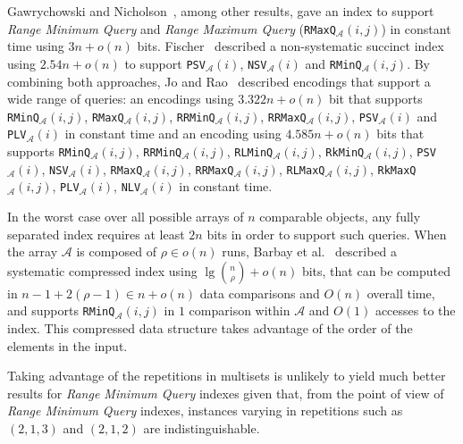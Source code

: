 Gawrychowski and
Nicholson~\cite{2015-ICALP-OptimalEncodingsForRangeTopKSelectionAndMinMax-GawrychowskiNicholson},
among other results, gave an index to support \emph{Range Minimum
  Query} and \emph{Range Maximum Query}
(\texttt{RMaxQ}$_{\mathcal{A}}(i,j)$) in constant time using
$3n + o(n)$ bits.
Fischer~\cite{2011-TCS-CombinedDataStructureForPreviousAndNextSmallerValues-Fischer}
described a non-systematic succinct index using $2.54n + o(n)$ to
support \texttt{PSV}$_{\mathcal{A}}(i)$,
\texttt{NSV}$_{\mathcal{A}}(i)$ and
\texttt{RMinQ}$_{\mathcal{A}}(i,j)$. By combining both approaches, Jo
and
Rao~\cite{2015-COCOON-SimultaneousEncodingsForRangeAndNextPreviousLargerSmallerValueQueries-JoRao}
described encodings that support a wide range of queries: an encodings
using $3.322n + o(n)$ bit that supports
\texttt{RMinQ}$_{\mathcal{A}}(i,j)$,
\texttt{RMaxQ}$_{\mathcal{A}}(i,j)$,
\texttt{RRMinQ}$_{\mathcal{A}}(i,j)$,
\texttt{RRMaxQ}$_{\mathcal{A}}(i,j)$, \texttt{PSV}$_{\mathcal{A}}(i)$
and \texttt{PLV}$_{\mathcal{A}}(i)$ in constant time and an encoding
using $4.585n + o(n)$ bits that supports
\texttt{RMinQ}$_{\mathcal{A}}(i,j)$,
\texttt{RRMinQ}$_{\mathcal{A}}(i,j)$,
\texttt{RLMinQ}$_{\mathcal{A}}(i,j)$,
\texttt{RkMinQ}$_{\mathcal{A}}(i,j)$, \texttt{PSV}$_{\mathcal{A}}(i)$,
\texttt{NSV}$_{\mathcal{A}}(i)$, \texttt{RMaxQ}$_{\mathcal{A}}(i,j)$,
\texttt{RRMaxQ}$_{\mathcal{A}}(i,j)$,
\texttt{RLMaxQ}$_{\mathcal{A}}(i,j)$,
\texttt{RkMaxQ}$_{\mathcal{A}}(i,j)$, \texttt{PLV}$_{\mathcal{A}}(i)$,
\texttt{NLV}$_{\mathcal{A}}(i)$ in constant time.

In the worst case over all
possible arrays of $n$ comparable objects, any fully separated index
requires at least $2n$ bits in order to support such queries.
% 
When the array ${\mathcal{A}}$ is composed of $\rho \in o(n)$ runs,
Barbay et
al.~\cite{2012-TCS-LRMTreesCompressedIndicesAdaptiveSortingAndCompressedPermutations-BarbayFischerNavarro}
described a systematic compressed index using
$\lg{n\choose \rho} + o(n)$ bits, that can be computed in
$n-1+2(\rho-1) \in n+o(n)$ data comparisons and $O(n)$ overall time,
and supports \texttt{RMinQ}$_{\mathcal{A}}(i,j)$ in $1$ comparison
within ${\mathcal{A}}$ and $O(1)$ accesses to the index. This
compressed data structure takes advantage of the order of the elements
in the input.

Taking advantage of the repetitions in multisets is unlikely to yield
much better results for \emph{Range Minimum Query} indexes given that,
from the point of view of \emph{Range Minimum Query} indexes,
instances varying in repetitions such as $(2,1,3)$ and $(2, 1, 2)$ are
indistinguishable.

